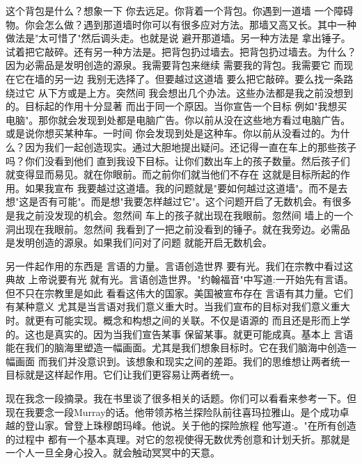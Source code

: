 这个背包是什么？想象一下 你去远足。你背着一个背包。你遇到一道墙 一个障碍物。你会怎么做？遇到那道墙时你可以有很多应对方法。那墙又高又长。其中一种做法是"太可惜了"然后调头走。也就是说 避开那道墙。另一种方法是 拿出锤子。试着把它敲碎。还有另一种方法是。把背包扔过墙去。把背包扔过墙去。为什么？因为必需品是发明创造的源泉。我需要背包来继续 需要我的背包。我需要它 而现在它在墙的另一边 我别无选择了。但要越过这道墙 要么把它敲碎。要么找一条路绕过它 从下方或是上方。突然间 我会想出几个办法。这些办法都是我之前没想到的。目标起的作用十分显著 而出于同一个原因。当你宣告一个目标 例如"我想买电脑"。那你就会发现到处都是电脑广告。你以前从没在这些地方看过电脑广告。或是说你想买某种车。一时间 你会发现到处是这种车。你以前从没看过的。为什么？因为我们一起创造现实。通过大胆地提出疑问。还记得一直在车上的那些孩子吗？你们没看到他们 直到我设下目标。让你们数出车上的孩子数量。然后孩子们就变得显而易见。就在你眼前。而之前你们就当他们不存在 这就是目标所起的作用。如果我宣布 我要越过这道墙。我的问题就是"要如何越过这道墙"。而不是去想"这是否有可能"。而是想"我要怎样越过它"。这个问题开启了无数机会。有很多是我之前没发现的机会。忽然间 车上的孩子就出现在我眼前。忽然间 墙上的一个洞出现在我眼前。忽然间 我看到了一把之前没看到的锤子。就在我旁边。必需品是发明创造的源泉。如果我们问对了问题 就能开启无数机会。 

另一件起作用的东西是 言语的力量。言语创造世界 要有光。我们在宗教中看过这典故 上帝说要有光 就有光。言语创造世界。"约翰福音"中写道:一开始先有言语。但不只在宗教里是如此 看看这伟大的国家。美国被宣布存在 言语有其力量。它们有某种意义 尤其是当言语对我们意义重大时。当我们宣布的目标对我们意义重大时。就更有可能实现。概念和构想之间的关联。不仅是语源的 而且还是形而上学的。这也是真实的。因为当我们宣告某事 保留某事。就更可能成真。基本上 言语能在我们的脑海里塑造一幅画面。尤其是我们想象目标时。它在我们脑海中创造一幅画面 而我们并没意识到。该想象和现实之间的差距。我们的思维想让两者统一 目标就是这样起作用。它们让我们更容易让两者统一。 

现在我念一段摘录。我在书里谈了很多相关的话题。你们可以看看来参考一下。但现在我要念一段Murray的话。他带领苏格兰探险队前往喜玛拉雅山。是个成功卓越的登山家。曾登上珠穆朗玛峰。他说。关于他的探险旅程 他写道:。"在所有创造的过程中 都有一个基本真理。对它的忽视使得无数优秀创意和计划夭折。那就是一个人一旦全身心投入。就会触动冥冥中的天意。 

